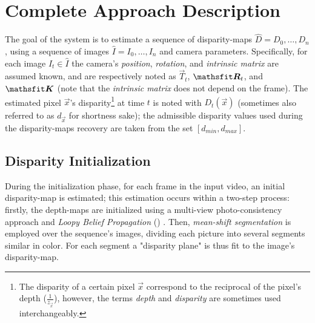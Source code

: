 

\chapter{Complete Approach Description}

 
 The goal of the system is to estimate a sequence of disparity-maps $\hat D = D_0, \dots, D_n$, using a sequence of images $\hat I = I_0, \dots, I_n$ and camera parameters.
 Specifically, for each image $I_t\in \hat I$ the camera's \emph{position}, \emph{rotation}, and \emph{intrinsic matrix} are assumed known, and are respectively noted as $\vec{T}_t$, $\mat{R}_t$, and $\mat K$ (note that the \emph{intrinsic matrix} does not depend on the frame).
 The estimated pixel $\vec x$'s disparity\footnote{The disparity of a certain pixel $\vec x$ correspond to the reciprocal of the pixel's depth ($\frac{1}{z_{\vec x}}$), however, the terms \emph{depth} and \emph{disparity} are sometimes used interchangeably.} at time $t$ is noted with $D_t(\vec x)$ (sometimes also referred to as $d_{\vec x}$ for shortness sake); the admissible disparity values used during the disparity-maps recovery are taken from the set $[d_{min}, d_{max}]$.
 

\section{Disparity Initialization}\label{sec:init_phase}
During the initialization phase, for each frame in the input video, an initial disparity-map is estimated; this estimation occurs within a two-step process: firstly, the depth-maps are initialized using a multi-view photo-consistency approach and \emph{Loopy Belief Propagation} (\LBP) \cite{Felzenszwalb2006}. Then, \emph{mean-shift segmentation}\cite{Comaniciu202} is employed over the sequence's images, dividing each picture into several segments similar in color. For each segment a "disparity plane" is thus fit to the image's disparity-map.

